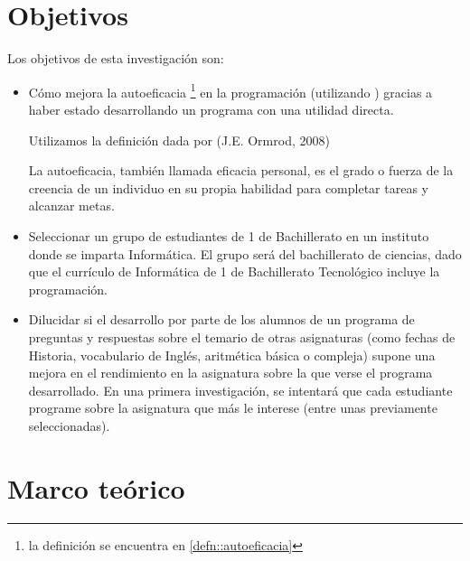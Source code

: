 \documentclass[palatino,miniheader]{apuntesURJC}
\begin{document}
\chapter{Objetivos}

Los objetivos de esta investigación son:
\begin{itemize}
	\item Cómo mejora la autoeficacia \footnote{la definición se encuentra en \ref{defn::autoeficacia}} en la programación (utilizando   \cite{CPSES}) gracias a haber estado desarrollando un programa con una utilidad directa.
	
	\begin{defn}[Autoeficacia]
	\label{defn::autoeficacia}

	Utilizamos la definición dada por (J.E. Ormrod, 2008) \cite{autoef}

	La autoeficacia, también llamada eficacia personal, es el grado o fuerza de la creencia de un individuo en su propia habilidad para completar tareas y alcanzar metas.

	\end{defn}

	\item Seleccionar un grupo de estudiantes de 1 de Bachillerato en un instituto donde se imparta Informática.  
	El grupo será del bachillerato de ciencias, dado que el currículo de Informática de 1 de Bachillerato Tecnológico incluye la programación.
	\item Dilucidar si el desarrollo por parte de los alumnos de un programa de preguntas y respuestas sobre el temario de otras asignaturas (como fechas de Historia, vocabulario de Inglés, aritmética básica o compleja) supone una mejora en el rendimiento en la asignatura sobre la que verse el programa desarrollado.
		\subitem En una primera investigación, se intentará que cada estudiante programe sobre la asignatura que más le interese (entre unas previamente seleccionadas).
\end{itemize}


\chapter{Marco teórico}
\end{document}
